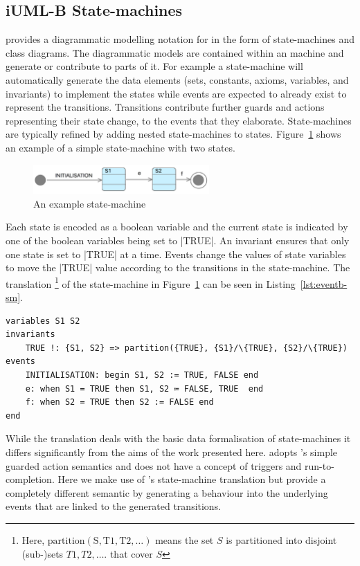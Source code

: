 
\subsection{iUML-B State-machines}
\label{sec:iumlb}

\iUMLB provides a diagrammatic modelling notation for \EventB in the form of state-machines and class diagrams. 
The diagrammatic models are contained within an \EventB machine and generate or contribute to parts of it. 
For example a state-machine will automatically generate the \EventB data elements (sets, constants, axioms, variables, and invariants) to implement the states while \EventB events are expected to already exist to represent the transitions. 
Transitions contribute further guards and actions representing their state change, to the events that they elaborate.  
State-machines are typically refined by adding nested state-machines to states.
Figure~\ref{fig:iumlb-sm} shows an example of a simple state-machine with two states.
\begin{figure}[!htbp]
	\centering
	\includegraphics[width=0.6\textwidth]{figures/iumlb-SM}
	\caption{An example \iUMLB state-machine}
	\label{fig:iumlb-sm}
\end{figure}

Each state is encoded as a boolean variable and the current state is indicated by one of the boolean variables being set to |TRUE|. 
An invariant ensures that only one state is set to |TRUE| at a time.
Events change the values of state variables to move the |TRUE| value according to the transitions in the state-machine.  
The \EventB translation%
%
\footnote{%
  Here, $\mathrm{partition(S, T1, T2, \ldots)}$ means the set $S$ is partitioned into disjoint (sub-)sets $T1, T2, \ldots$.
that cover $S$} %
of the state-machine in Figure~\ref{fig:iumlb-sm} can be seen in Listing~\ref{lst:eventb-sm}.%
\begin{lstlisting}[caption={Translation of the state-machine in Fig.~\ref{fig:iumlb-sm}},label={lst:eventb-sm}, language=Event-B, escapechar=|, frame=single]
 variables S1 S2
invariants 
	TRUE !: {S1, S2} => partition({TRUE}, {S1}/\{TRUE}, {S2}/\{TRUE})
events
    INITIALISATION: begin S1, S2 := TRUE, FALSE end
    e: when S1 = TRUE then S1, S2 ≔ FALSE, TRUE  end
    f: when S2 = TRUE then S2 := FALSE end
end
\end{lstlisting}	

While the \iUMLB translation deals with the basic data formalisation of state-machines it differs significantly from the aims of the work presented here. 
\iUMLB adopts \EventB's simple guarded action semantics and does not have a concept of triggers and run-to-completion.
Here we make use of \iUMLB's state-machine translation but provide a completely different semantic by generating a behaviour into the underlying \EventB events that are linked to the generated \iUMLB transitions.
